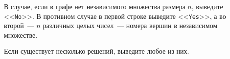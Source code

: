 В случае, если в графе нет независимого множества размера $n$, выведите <<\texttt{No}>>. В противном случае в первой строке выведите <<\texttt{Yes}>>, а во второй~--- $n$ различных целых чисел~--- номера вершин в независимом множестве.

Если существует несколько решений, выведите любое из них.
